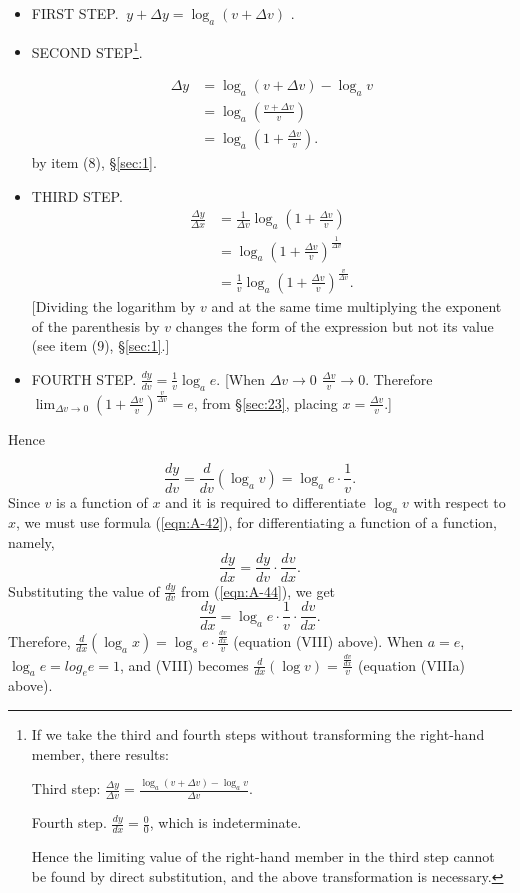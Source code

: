 \begin{itemize}
\item 
FIRST STEP. $	\ y + \Delta y 	= \log_a(v + \Delta v)$ .
\item 
SECOND STEP\footnote{If we take the third and fourth steps 
without transforming the right-hand member, there results:

Third step: $\frac{\Delta y}{\Delta v} 
= \frac{\log_a(v + \Delta v) - \log_a v}{\Delta v}$.

Fourth step. $\frac{dy}{dx} = \frac{0}{0}$, which is indeterminate. 

Hence the limiting value of the right-hand member in the third step cannot be 
found by direct substitution, and the above transformation is necessary.}.

\[
\begin{array}{ll}
 \Delta y &= \log_a(v + \Delta v) - \log_a v\\
 & = \log_a \left ( \frac{v + \Delta v}{v} \right )\\
& = \log_a \left ( 1 + \frac{\Delta v}{v} \right ).
\end{array}
\]
by item (8), \S \ref{sec:1}.

\item 
THIRD STEP. 
\[
\begin{array}{ll}
\frac{\Delta y}{\Delta x} &= \frac{1}{\Delta v} 
\log_a \left ( 1 + \frac{\Delta v}{v} \right ) \\
&= \log_a \left ( 1 + \frac{\Delta v}{v} \right )^{\frac{1}{\Delta v}}\\
 & 	= \frac{1}{v} 
\log_a \left ( 1 + \frac{\Delta v}{v} \right )^{\frac{v}{\Delta v}}.
\end{array}
\]
[Dividing the logarithm by $v$ and at the same 
time multiplying the exponent of the 
parenthesis by $v$ changes the form of the expression but not its value (see 
item (9), \S \ref{sec:1}.]

\item 
FOURTH STEP. $	\frac{dy}{dv} 	= \frac{1}{v} \log_a e$.
[When $\Delta v \to 0$ $\frac{\Delta v}{v} \to 0$. Therefore 
$\lim_{\Delta v \to 0} 
\left ( 1 + \frac{\Delta v}{v} \right )^{\frac{v}{\Delta v}} = e$, 
from \S \ref{sec:23}, placing $x = \frac{\Delta v}{v}$.]
\end{itemize}

Hence

\begin{equation}
\frac{dy}{dv} 	= \frac{d}{dv} \left ( \log_a v \right ) 
= \log_a e \cdot \frac{1}{v}.
\label{eqn:A-44}
\end{equation}
Since $v$ is a function of $x$ and it is required to differentiate $\log_a v$ 
with respect to $x$, we must use formula (\ref{eqn:A-42}),
for differentiating a function of a function, namely,
\[
  	\frac{dy}{dx} 	= \frac{dy}{dv} \cdot \frac{dv}{dx}.
\]
Substituting 
the %
value of $\frac{dy}{dv}$ from (\ref{eqn:A-44}), we get
\[
  	\frac{dy}{dx} 	= \log_a e \cdot \frac{1}{v} \cdot \frac{dv}{dx}.
\]
Therefore, $\frac{d}{dx} (\log_a x) 	
= \log_s e \cdot \frac{\frac{dv}{dx}}{v}$
(equation (VIII) above).
When $a = e$,\ $\log_a e = log_e e = 1$, and (VIII) becomes
$\frac{d}{dx} (\log v) 	= \frac{\frac{dv}{dx}}{v}$ (equation (VIIIa) above).

